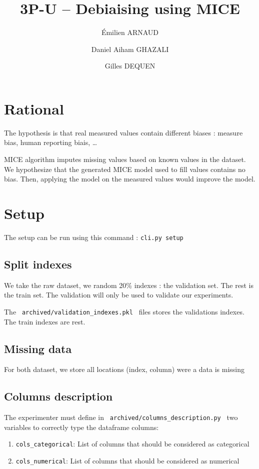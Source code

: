 \documentclass{article}
\title{3P-U -- Debiaising using MICE}
\author[1,2]{\'Emilien ARNAUD}
\author[1]{Daniel Aiham GHAZALI}
\author[2]{Gilles DEQUEN}
\affil[1]{Department of Emergency Medicine, Amiens University Hospital}
\affil[2]{Modelisation, Information and Systems laboratory, Amiens Picardy Jules Vernes University}
\begin{document}
    \maketitle{}
    \section{Rational}
        The hypothesis is that real measured values contain different biases : measure bias, human reporting biais, \dots

        MICE algorithm imputes missing values based on known values in the dataset. We hypothesize that the generated MICE model used to fill values contains no bias. Then, applying the model on the measured values would improve the model.

    \section{Setup}

        The setup can be run using this command : \texttt{cli.py setup}

        \subsection{Split indexes}

        We take the raw dataset, we random 20\% indexes : the  validation set. The rest is the train set. The validation will only be used to validate our experiments.

        The \texttt{ archived/validation\_indexes.pkl } files stores the validations indexes. The train indexes are rest.


        \subsection{Missing data}

        For both dataset, we store all locations (index, column) were a data is missing

        \subsection{Columns description}

        The experimenter must define in \texttt{ archived/columns\_description.py } two variables to correctly type the dataframe columns:

        \begin{enumerate}
            \item \texttt{cols\_categorical}: List of columns that should be considered as categorical
            \item \texttt{cols\_numerical}: List of columns that should be considered as numerical
        \end{enumerate}
\end{document}
